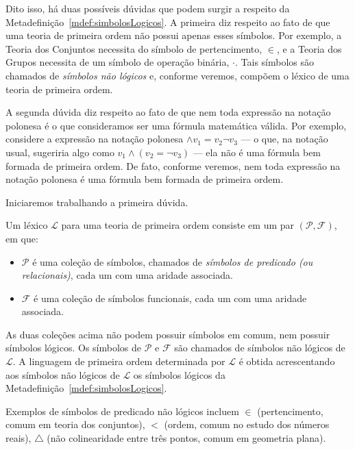 Dito isso, há duas possíveis dúvidas que podem surgir a respeito da Metadefinição~\ref{mdef:simbolosLogicos}.
A primeira diz respeito ao fato de que uma teoria de primeira ordem não possui apenas esses símbolos.
Por exemplo, a Teoria dos Conjuntos necessita do símbolo de pertencimento, $\in$, e a Teoria dos Grupos necessita de um símbolo de operação binária, $\cdot$.
Tais símbolos são chamados de \emph{símbolos não lógicos} e, conforme veremos, compõem o léxico de uma teoria de primeira ordem.

A segunda dúvida diz respeito ao fato de que nem toda expressão na notação polonesa é o que consideramos ser uma fórmula matemática válida.
Por exemplo, considere a expressão na notação polonesa ${\wedge} v_1 {=} v_2 \neg v_3$ --- o que, na notação usual, sugeriria algo como $v_1 \wedge (v_2 = \neg v_3)$ --- ela não é uma fórmula bem formada de primeira ordem.
De fato, conforme veremos, nem toda expressão na notação polonesa é uma fórmula bem formada de primeira ordem.

Iniciaremos trabalhando a primeira dúvida.

\begin{metadefinition}\label{mdef:lexicoPrimeiraOrdem}
    Um léxico $\mathcal L$ para uma teoria de primeira ordem consiste em um par $(\mathcal P, \mathcal F)$, em que:

    \begin{itemize}
        \item $\mathcal P$ é uma coleção de símbolos, chamados de \emph{símbolos de predicado (ou relacionais)}, cada um com uma aridade associada.
        \item $\mathcal F$ é uma coleção de símbolos funcionais, cada um com uma aridade associada.
    \end{itemize}
    As duas coleções acima não podem possuir símbolos em comum, nem possuir símbolos lógicos.
    Os símbolos de $\mathcal P$ e $\mathcal F$ são chamados de símbolos não lógicos de $\mathcal L$.
    A linguagem de primeira ordem determinada por $\mathcal L$ é obtida acrescentando aos símbolos não lógicos de $\mathcal L$ os símbolos lógicos da Metadefinição~\ref{mdef:simbolosLogicos}.
\end{metadefinition}

Exemplos de símbolos de predicado não lógicos incluem $\in$ (pertencimento, comum em teoria dos conjuntos), $<$ (ordem, comum no estudo dos números reais), $\triangle$ (não colinearidade entre três pontos, comum em geometria plana).

